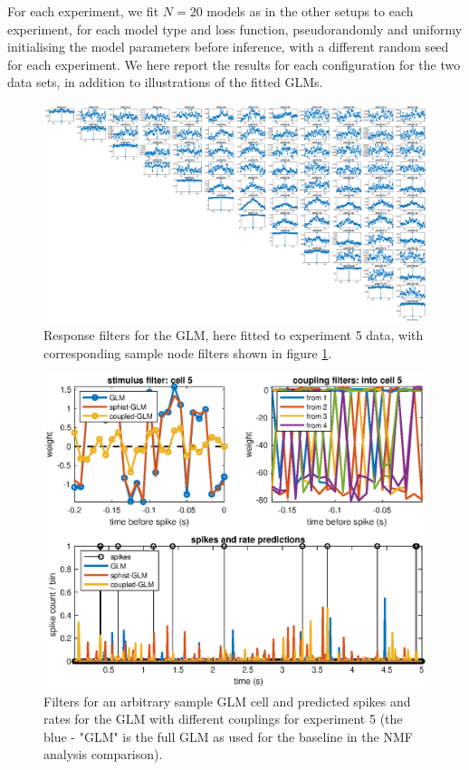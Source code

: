 \documentclass[mphil,deptreport,ianc]{infthesis} %
\begin{document}
For each experiment, we fit $N=20$ models as in the other setups to each experiment, for each model type and loss function, pseudorandomly and uniformy initialising the model parameters before inference, with a different random seed for each experiment.
We here report the results for each configuration for the two data sets, in addition to illustrations of the fitted GLMs.

\begin{figure}
    \includegraphics[width=1.1\columnwidth]{figures/sleep/plot1_cell5_pdf.eps}
    \caption{Response filters for the GLM, here fitted to experiment 5 data, with corresponding sample node filters shown in figure \ref{fig:glm_sample_cell_5_exp_5}.}
\end{figure}

\begin{figure}
    \centering
    \includegraphics[width=0.9\columnwidth]{figures/sleep/GLM_multi_cell5_5sec_bin_white_noise.eps}
    \caption{Filters for an arbitrary sample GLM cell and predicted spikes and rates for the GLM with different couplings for experiment 5 (the blue - "GLM" is the full GLM as used for the baseline in the NMF analysis comparison).}
    \label{fig:glm_sample_cell_5_exp_5}
\end{figure}
\end{document}
